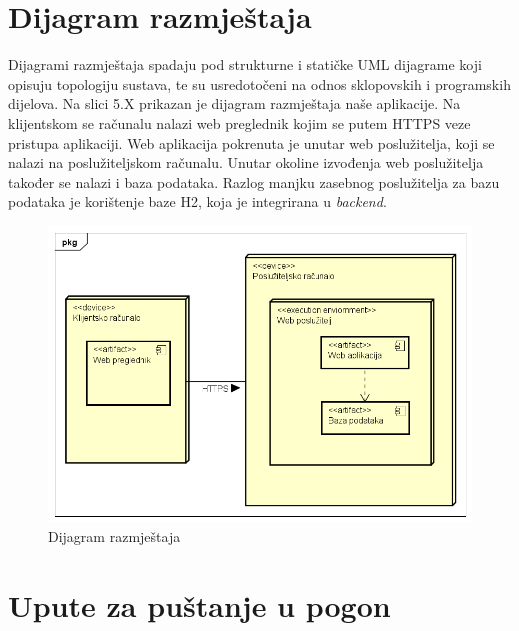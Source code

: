		
		\section{Dijagram razmještaja}
			
			\text Dijagrami razmještaja spadaju pod strukturne i statičke UML dijagrame koji opisuju topologiju sustava, te su usredotočeni na odnos sklopovskih i programskih dijelova. Na slici 5.X prikazan je dijagram razmještaja naše aplikacije. Na klijentskom se računalu nalazi web preglednik kojim se putem HTTPS veze pristupa aplikaciji. Web aplikacija pokrenuta je unutar web poslužitelja, koji se nalazi na poslužiteljskom računalu. Unutar okoline izvođenja web poslužitelja također se nalazi i baza podataka. Razlog manjku zasebnog poslužitelja za bazu podataka je korištenje baze H2, koja je integrirana u \textit{backend}.
			
			\begin{figure}[H]
				\includegraphics[scale=0.7]{dijagrami/dijrazm1.PNG} %
				\centering
				\caption{Dijagram razmještaja}
				\label{fig:dijstanj1}
			\end{figure}
			
			\eject 
		
		\section{Upute za puštanje u pogon}
		
